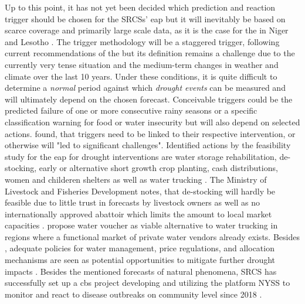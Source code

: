 Up to this point, it has not yet been decided which prediction and reaction trigger should be chosen for the SRCSs' \acrshort*{eap} but it will inevitably be based on scarce coverage and primarily large scale data, as it is the case for the  in Niger and Lesotho \autocite{lesothoredcrosssocietyEARLYACTIONPROTOCOL2022,nigerredcrosssocietyNigerDroughtEarly2021}.
The trigger methodology will be a staggered trigger, following current recommendations of the \autocite{rcrcFORECASTBASEDFINANCINGEARLY2020} but its definition remains a challenge due to the currently very tense situation and the medium-term changes in weather and climate over the last 10 years. Under these conditions, it is quite difficult to determine a \textit{normal} period against which \textit{drought events} can be measured and will ultimately depend on the chosen forecast. Conceivable triggers could be the predicted failure of one or more consecutive rainy seasons or a specific classification warning for food or water insecurity but will also depend on selected actions. \autocite[19]{gettliffeOCHAAnticipatoryAction2021} found, that triggers need to be linked to their respective intervention, or otherwise will "led to significant challenges".
Identified actions by the feasibility study for the \acrshort*{eap} for drought interventions are water storage rehabilitation, de-stocking, early or alternative short growth crop planting, cash distributions, women and childeren shelters as well as water trucking \autocite{somaliredcrescentsocietyFeasibilityStudyPotential2022}. The Ministry of Livestock and Fisheries Development notes, that de-stocking will hardly be feasible due to little trust in forecasts by livestock owners as well as no internationally approved abattoir which limits the amount to local market capacities \autocite{somaliredcrescentsocietyFeasibilityStudyPotential2022}. \autocite{gualazziniEWEAEarlyWarning2021} propose water voucher as viable alternative to water trucking in regions where a functional market of private water vendors already exists. Besides , adequate policies for water management, price regulations, and allocation mechanisms are seen as potential opportunities to mitigate further drought impacts \autocite{gualazziniEWEAEarlyWarning2021,wangPropagationDroughtMeteorological2016}.
Besides the mentioned forecasts of natural phenomena, SRCS has successfully set up a \acrshort*{cbs} project developing and utilizing the platform NYSS to monitor and react to disease outbreaks on community level since 2018 \autocite{jungCommunityBasedSurveillance2022}. 

